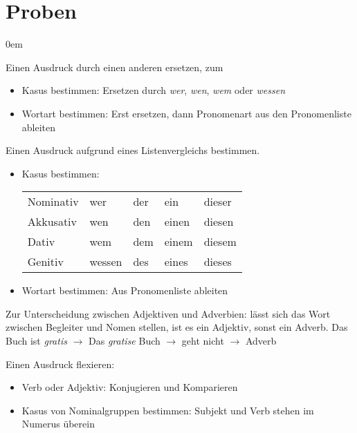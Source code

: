 \section{Proben}

\begin{description}\itemsep0em
	\item [Ersatzprobe] Einen Ausdruck durch einen anderen ersetzen, zum
	\begin{itemize}\itemsep0em
		\item Kasus bestimmen: Ersetzen durch \textit{wer}, \textit{wen}, \textit{wem} oder \textit{wessen}
		\item Wortart bestimmen: Erst ersetzen, dann Pronomenart aus den Pronomenliste ableiten
	\end{itemize}

	\item[Ablese- oder Listenprobe] Einen Ausdruck aufgrund eines Listenvergleichs bestimmen.
	\begin{itemize}\itemsep0em
		\item Kasus bestimmen:
		\begin{tabular}{lllll}
		Nominativ & wer & der & ein & dieser\\
		Akkusativ & wen & den & einen & diesen\\
		Dativ & wem & dem & einem & diesem\\
		Genitiv & wessen & des & eines & dieses\\
		\end{tabular}
		
		\item Wortart bestimmen: Aus Pronomenliste ableiten
	\end{itemize}

	\item [Einsetzprobe] Zur Unterscheidung zwischen Adjektiven und Adverbien: lässt sich das Wort zwischen
	Begleiter und Nomen stellen, ist es ein Adjektiv, sonst ein Adverb.
	Das Buch ist \textit{gratis} $\rightarrow$ Das \textit{gratise} Buch $\rightarrow$ geht nicht $\rightarrow$ Adverb

	\item [Flexionsprobe] Einen Ausdruck flexieren:
	\begin{itemize}\itemsep0em
		\item Verb oder Adjektiv: Konjugieren und Komparieren
		\item Kasus von Nominalgruppen bestimmen: Subjekt und Verb stehen im Numerus überein
	\end{itemize}


\end{description}
